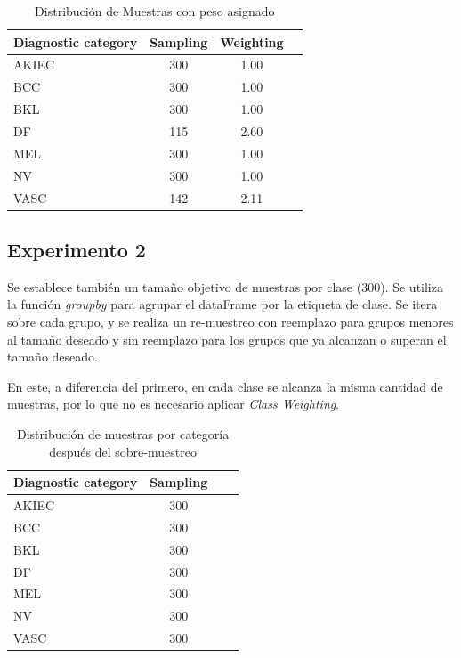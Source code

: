 \begin{table}[ht]
   \centering
   \begin{tabular}{lccc}
   \hline
   Diagnostic category & Sampling  & Weighting\\ \hline
   AKIEC & 300 & 1.00\\
   BCC & 300 & 1.00\\
   BKL & 300 & 1.00\\
   DF & 115 & 2.60\\
   MEL & 300 & 1.00\\
   NV & 300 & 1.00\\
   VASC & 142 & 2.11\\ \hline
   \end{tabular}
   \caption{Distribución de Muestras con peso asignado}
   \label{tab:weighting_distribution}
   \end{table}

\subsection{Experimento 2}

Se establece también un tamaño objetivo de muestras por clase ($300$). Se utiliza la función \textit{groupby} para agrupar el dataFrame por la etiqueta de clase. Se itera sobre cada grupo, y se realiza un re-muestreo con reemplazo para grupos menores al tamaño deseado y sin reemplazo para los grupos que ya alcanzan o superan el tamaño deseado.

En este, a diferencia del primero, en cada clase se alcanza la misma cantidad de muestras, por lo que no es necesario aplicar \textit{Class Weighting}.

\begin{table}[ht]
   \centering
   \begin{tabular}{lccc}
   \hline
   Diagnostic category & Sampling  \\ \hline
   AKIEC & 300 \\
   BCC & 300 \\
   BKL & 300 \\
   DF & 300 \\
   MEL & 300 \\
   NV & 300 \\
   VASC & 300 \\ \hline
   \end{tabular}
   \caption{Distribución de muestras por categoría después del sobre-muestreo}
   \label{tab:sampling_distribution}
   \end{table}

